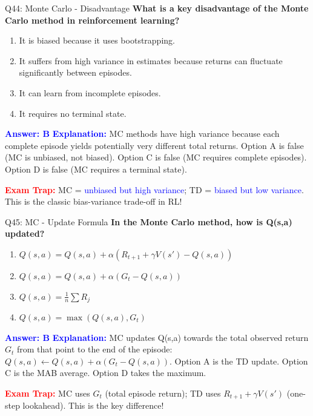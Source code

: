 \documentclass[8pt]{beamer}
\begin{document}
	\begin{frame}{Q44: Monte Carlo - Disadvantage}
		\fontsize{6.5}{7.5}\selectfont
		\textbf{What is a key disadvantage of the Monte Carlo method in reinforcement learning?}
		
		\begin{enumerate}
			\item It is biased because it uses bootstrapping.
			\item It suffers from high variance in estimates because returns can fluctuate significantly between episodes.
			\item It can learn from incomplete episodes.
			\item It requires no terminal state.
		\end{enumerate}
		
		\vspace{0.1cm}
		\textcolor{blue}{\textbf{Answer: B}}
		\vspace{0.1cm}
		\textcolor{blue}{\textbf{Explanation:}} MC methods have high variance because each complete episode yields potentially very different total returns. Option A is false (MC is unbiased, not biased). Option C is false (MC requires complete episodes). Option D is false (MC requires a terminal state).
		
		\textcolor{red}{\textbf{Exam Trap:}} MC = \textcolor{blue}{unbiased but high variance}; TD = \textcolor{blue}{biased but low variance}. This is the classic bias-variance trade-off in RL!
	\end{frame}
	
	\begin{frame}{Q45: MC - Update Formula}
		\fontsize{6.5}{7.5}\selectfont
		\textbf{In the Monte Carlo method, how is Q(s,a) updated?}
		
		\begin{enumerate}
			\item $Q(s,a) = Q(s,a) + \alpha(R_{t+1} + \gamma V(s') - Q(s,a))$
			\item $Q(s,a) = Q(s,a) + \alpha(G_t - Q(s,a))$
			\item $Q(s,a) = \frac{1}{n}\sum R_j$
			\item $Q(s,a) = \max(Q(s,a), G_t)$
		\end{enumerate}
		
		\vspace{0.1cm}
		\textcolor{blue}{\textbf{Answer: B}}
		\vspace{0.1cm}
		\textcolor{blue}{\textbf{Explanation:}} MC updates Q(s,a) towards the total observed return $G_t$ from that point to the end of the episode: $Q(s,a) \leftarrow Q(s,a) + \alpha(G_t - Q(s,a))$. Option A is the TD update. Option C is the MAB average. Option D takes the maximum.
		
		\textcolor{red}{\textbf{Exam Trap:}} MC uses $G_t$ (total episode return); TD uses $R_{t+1} + \gamma V(s')$ (one-step lookahead). This is the key difference!
	\end{frame}
	
\end{document}

